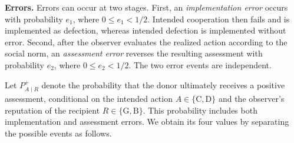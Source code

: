 \documentclass[fleqn,10pt]{wlscirep}
\begin{document}
\textbf{Errors.} Errors can occur at two stages. First, an \emph{implementation error} occurs with probability $e_1$, where $0\leq e_1<1/2$. Intended cooperation then fails and is implemented as defection, whereas intended defection is implemented without error. Second, after the observer evaluates the realized action according to the social norm, an \emph{assessment error} reverses the resulting assessment with probability $e_2$, where $0\leq e_2<1/2$. The two error events are independent.

Let $P^+_{A\mid R}$ denote the probability that the donor ultimately receives a positive assessment, conditional on the intended action $A\in\{\mathrm{C},\mathrm{D}\}$ and the observer's reputation of the recipient $R\in\{\mathrm{G},\mathrm{B}\}$. This probability includes both implementation and assessment errors. We obtain its four values by separating the possible events as follows.
\end{document}
